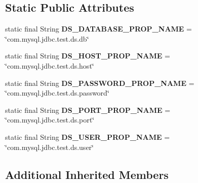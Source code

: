 \subsection*{Static Public Attributes}
\begin{DoxyCompactItemize}
\item 
\mbox{\label{classtestsuite_1_1regression_1_1_data_source_regression_test_a37d09e3300941d626bb43ef132014cb8}} 
static final String {\bfseries D\+S\+\_\+\+D\+A\+T\+A\+B\+A\+S\+E\+\_\+\+P\+R\+O\+P\+\_\+\+N\+A\+ME} = \char`\"{}com.\+mysql.\+jdbc.\+test.\+ds.\+db\char`\"{}
\item 
\mbox{\label{classtestsuite_1_1regression_1_1_data_source_regression_test_ad9fd875d5db90566e3ad718f643f3006}} 
static final String {\bfseries D\+S\+\_\+\+H\+O\+S\+T\+\_\+\+P\+R\+O\+P\+\_\+\+N\+A\+ME} = \char`\"{}com.\+mysql.\+jdbc.\+test.\+ds.\+host\char`\"{}
\item 
\mbox{\label{classtestsuite_1_1regression_1_1_data_source_regression_test_a5f0a95beff5b4468b387cd1488a8e63f}} 
static final String {\bfseries D\+S\+\_\+\+P\+A\+S\+S\+W\+O\+R\+D\+\_\+\+P\+R\+O\+P\+\_\+\+N\+A\+ME} = \char`\"{}com.\+mysql.\+jdbc.\+test.\+ds.\+password\char`\"{}
\item 
\mbox{\label{classtestsuite_1_1regression_1_1_data_source_regression_test_a646a32446d1125335f74baa59c641835}} 
static final String {\bfseries D\+S\+\_\+\+P\+O\+R\+T\+\_\+\+P\+R\+O\+P\+\_\+\+N\+A\+ME} = \char`\"{}com.\+mysql.\+jdbc.\+test.\+ds.\+port\char`\"{}
\item 
\mbox{\label{classtestsuite_1_1regression_1_1_data_source_regression_test_a40be67f5978728ef06db3c525b9467fa}} 
static final String {\bfseries D\+S\+\_\+\+U\+S\+E\+R\+\_\+\+P\+R\+O\+P\+\_\+\+N\+A\+ME} = \char`\"{}com.\+mysql.\+jdbc.\+test.\+ds.\+user\char`\"{}
\end{DoxyCompactItemize}
\subsection*{Additional Inherited Members}



